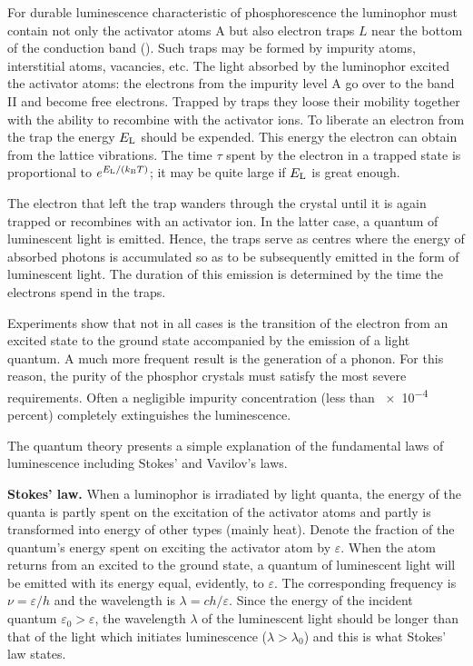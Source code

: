 For durable luminescence characteristic of phosphorescence the luminophor must contain not only the activator atoms A but also electron traps $L$ near the bottom of the conduction band (). Such traps may be formed by impurity atoms, interstitial atoms, vacancies, etc. The light absorbed by the luminophor excited the activator atoms: the electrons from the impurity level A go over to the band II and become free electrons. Trapped by traps they loose their mobility together with the ability to recombine with the activator ions. To liberate an electron from the trap the energy $E_{\text{L}}$ should be expended. This energy the electron can obtain from the lattice vibrations. The time $\tau$ spent by the electron in a trapped state is proportional to $e^{E_{\text{L}}/(k_{\text{B}}T)}$; it may be quite large if $E_{\text{L}}$ is great enough.

The electron that left the trap wanders through the crystal until it is again trapped or recombines with an activator ion. In the latter case, a quantum of luminescent light is emitted. Hence, the traps serve as centres where the energy of absorbed photons is accumulated so as to be subsequently emitted in the form of luminescent light. The duration of this emission is determined by the time the electrons spend in the traps.

Experiments show that not in all cases is the transition of the electron from an excited state to the ground state accompanied by the emission of a light quantum. A much more frequent result is the generation of a phonon. For this reason, the purity of the phosphor crystals must satisfy the most severe requirements. Often a negligible impurity concentration (less than \num{e-4} percent) completely extinguishes the luminescence.

The quantum theory presents a simple explanation of the fundamental laws of luminescence including Stokes' and Vavilov's laws.

\textbf{Stokes' law.} When a luminophor is irradiated by light quanta, the energy of the quanta is partly spent on the excitation of the activator atoms and partly is transformed into energy of other types (mainly heat). Denote the fraction of the quantum's energy spent on exciting the activator atom by $\varepsilon$. When the atom returns from an excited to the ground state, a quantum of luminescent light will be emitted with its energy equal, evidently, to $\varepsilon$. The corresponding frequency is $\nu=\varepsilon/h$ and the wavelength is $\lambda=ch/\varepsilon$. Since the energy of the incident quantum $\varepsilon_0>\varepsilon$, the wavelength $\lambda$ of the luminescent light should be longer than that of the light which initiates luminescence ($\lambda>\lambda_0$) and this is what Stokes' law states.

